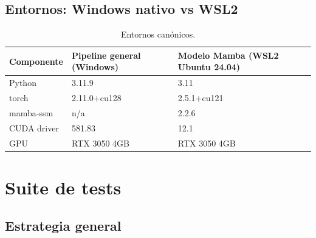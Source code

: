 \documentclass[11pt,a4paper]{article}
\begin{document}
\subsection{Entornos: Windows nativo vs WSL2}
\begin{table}[H]
\centering
\caption{Entornos canónicos.}
\begin{tabular}{lll}
\toprule
Componente & Pipeline general (Windows) & Modelo Mamba (WSL2 Ubuntu 24.04) \\
\midrule
Python      & 3.11.9              & 3.11                          \\
torch       & 2.11.0+cu128        & 2.5.1+cu121                   \\
mamba-ssm   & n/a                 & 2.2.6                          \\
CUDA driver & 581.83              & 12.1                           \\
GPU         & RTX 3050 4GB        & RTX 3050 4GB                   \\
\bottomrule
\end{tabular}
\end{table}

\section{Suite de tests}
\label{sec:tests}

\subsection{Estrategia general}
\end{document}
